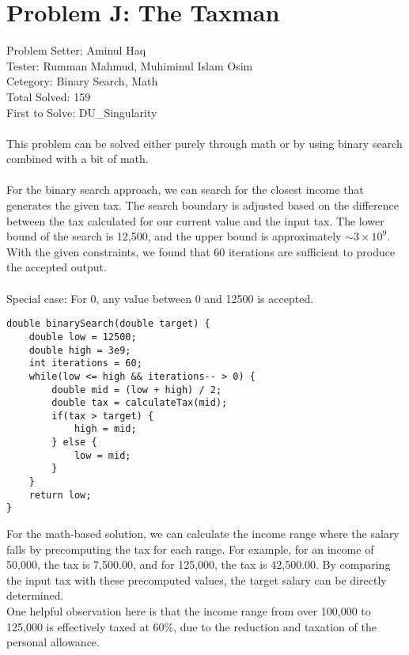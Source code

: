 \section*{Problem J: The Taxman}
Problem Setter: Aminul Haq \\
Tester: Rumman Mahmud,  Muhiminul Islam Osim \\
Cetegory: Binary Search, Math \\
Total Solved: 159 \\
First to Solve: DU\_Singularity \\
\\
This problem can be solved either purely through math or by using binary search combined with a bit of math. \\
\\
For the binary search approach, we can search for the closest income that generates the given tax. The search boundary is adjusted based on the difference between the tax calculated for our current value and the input tax. The lower bound of the search is 12,500, and the upper bound is approximately \(\sim 3 \times 10^9\). With the given constraints, we found that 60 iterations are sufficient to produce the accepted output.\\
\\
Special case: For 0, any value between 0 and 12500 is accepted.
\begin{verbatim}
double binarySearch(double target) {
    double low = 12500;
    double high = 3e9;
    int iterations = 60;
    while(low <= high && iterations-- > 0) {
        double mid = (low + high) / 2;
        double tax = calculateTax(mid);
        if(tax > target) {
            high = mid;
        } else {
            low = mid;
        }
    }
    return low;
}
\end{verbatim}

For the math-based solution, we can calculate the income range where the salary falls by precomputing the tax for each range. For example, for an income of 50,000, the tax is 7,500.00, and for 125,000, the tax is 42,500.00. By comparing the input tax with these precomputed values, the target salary can be directly determined.\\
One helpful observation here is that the income range from over 100,000 to 125,000 is effectively taxed at 60\%, due to the reduction and taxation of the personal allowance.\\
\\

